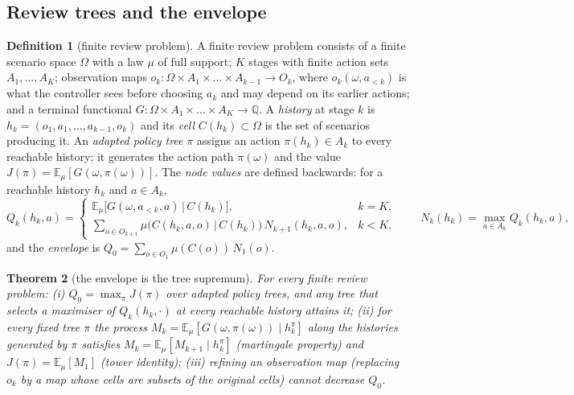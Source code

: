 \documentclass[11pt,a4paper]{article}
\theoremstyle{plain}
\newtheorem{theorem}{Theorem}[section]
\theoremstyle{definition}
\newtheorem{definition}[theorem]{Definition}
\theoremstyle{remark}
\newcommand{\Qr}{\mathbb{Q}}
\newcommand{\E}{\mathbb{E}}
\begin{document}
\subsection{Review trees and the envelope}

\begin{definition}[finite review problem]\label{def:tree}
A finite review problem consists of a finite scenario space $\Omega$ with a law $\mu$ of full support; $K$ stages with finite action sets $A_1,\dots,A_K$; observation maps $o_k:\Omega\times A_1\times\dots\times A_{k-1}\to O_k$, where $o_k(\omega,a_{<k})$ is what the controller sees before choosing $a_k$ and may depend on its earlier actions; and a terminal functional $G:\Omega\times A_1\times\dots\times A_K\to\Qr$. A \emph{history} at stage $k$ is $h_k=(o_1,a_1,\dots,a_{k-1},o_k)$ and its \emph{cell} $C(h_k)\subset\Omega$ is the set of scenarios producing it. An \emph{adapted policy tree} $\pi$ assigns an action $\pi(h_k)\in A_k$ to every reachable history; it generates the action path $\pi(\omega)$ and the value $J(\pi)=\E_\mu[G(\omega,\pi(\omega))]$. The \emph{node values} are defined backwards: for a reachable history $h_k$ and $a\in A_k$,
\begin{equation}\label{eq:N}
Q_k(h_k,a)=\begin{cases}\E_\mu\bigl[G(\omega,a_{<k},a)\,\big|\,C(h_k)\bigr], & k=K,\\[2pt]
\displaystyle\sum_{o\in O_{k+1}}\mu\bigl(C(h_k,a,o)\,\big|\,C(h_k)\bigr)\,N_{k+1}(h_k,a,o), & k<K,\end{cases}\qquad
N_k(h_k)=\max_{a\in A_k}Q_k(h_k,a),
\end{equation}
and the \emph{envelope} is $Q_0=\sum_{o\in O_1}\mu(C(o))\,N_1(o)$.
\end{definition}

\begin{theorem}[the envelope is the tree supremum]\label{thm:envelope}
For every finite review problem: (i) $Q_0=\max_\pi J(\pi)$ over adapted policy trees, and any tree that selects a maximiser of $Q_k(h_k,\cdot)$ at every reachable history attains it; (ii) for every fixed tree $\pi$ the process $M_k=\E_\mu[G(\omega,\pi(\omega))\mid h_k^\pi]$ along the histories generated by $\pi$ satisfies $M_k=\E_\mu[M_{k+1}\mid h_k^\pi]$ (martingale property) and $J(\pi)=\E_\mu[M_1]$ (tower identity); (iii) refining an observation map (replacing $o_k$ by a map whose cells are subsets of the original cells) cannot decrease $Q_0$.
\end{theorem}
\end{document}
